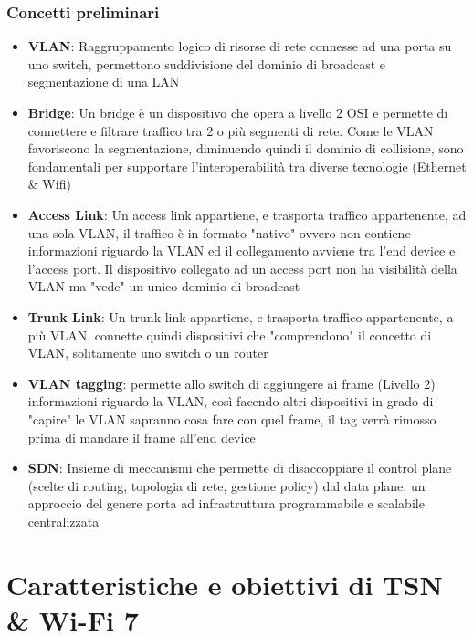 \documentclass[12pt,a4paper,twoside]{book}
\begin{document}
\begin{onehalfspace}
\subsection*{Concetti preliminari}
\begin{itemize}
    \item \textbf{VLAN}: Raggruppamento logico di risorse di rete connesse ad una porta su uno switch, permettono suddivisione del dominio di broadcast e segmentazione di una LAN
    \item \textbf{Bridge}: Un bridge è un dispositivo che opera a livello 2 OSI e permette di connettere e filtrare traffico tra 2 o più segmenti di rete. Come le VLAN favoriscono la segmentazione, diminuendo quindi il dominio di collisione, sono fondamentali per supportare l'interoperabilità tra diverse tecnologie (Ethernet \& Wifi) 
    \item \textbf{Access Link}: Un access link appartiene, e trasporta traffico appartenente, ad una sola VLAN, il traffico è in formato "nativo" ovvero non contiene informazioni riguardo la VLAN ed il collegamento avviene tra l'end device e l'access port. Il dispositivo collegato ad un access port non ha visibilità della VLAN ma "vede" un unico dominio di broadcast
    \item \textbf{Trunk Link}: Un trunk link appartiene, e trasporta traffico appartenente, a più VLAN, connette quindi dispositivi che "comprendono" il concetto di VLAN, solitamente uno switch o un router
    \item \textbf{VLAN tagging}: permette allo switch di aggiungere ai frame (Livello 2) informazioni riguardo la VLAN, così facendo altri dispositivi in grado di "capire" le VLAN sapranno cosa fare con quel frame, il tag verrà rimosso prima di mandare il frame all'end device \cite{VLAN_tagging}
    \item \textbf{SDN}: Insieme di meccanismi che permette di disaccoppiare il control plane (scelte di routing, topologia di rete, gestione policy) dal data plane, un approccio del genere porta ad infrastruttura programmabile e scalabile centralizzata \cite{Software_Defined_Networking_for_Organizations_Network_Automation}
\end{itemize}
\chapter{Caratteristiche e obiettivi di TSN \& Wi-Fi 7}\label{chap:cap1}





\end{onehalfspace}
\end{document}

